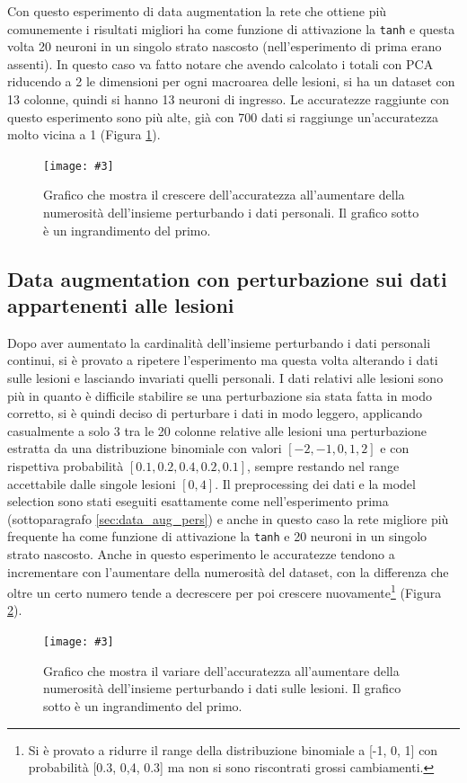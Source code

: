 \documentclass[12pt, twoside, letterpaper]{report}
\newcommand{\img}[4] {
	\begin{figure}
		\centering
		\texttt{[image: \#3]}\\
		\caption{#1}
		\label{fig:#4}
	\end{figure}
}
\begin{document}
			Con questo esperimento di data augmentation la rete che ottiene più comunemente i risultati migliori ha come funzione di attivazione la \texttt{tanh} e questa volta 20 neuroni in un singolo strato nascosto (nell'esperimento di prima erano assenti). In questo caso va fatto notare che avendo calcolato i totali con PCA riducendo a 2 le dimensioni per ogni macroarea delle lesioni, si ha un dataset con 13 colonne, quindi si hanno 13 neuroni di ingresso. Le accuratezze raggiunte con questo esperimento sono più alte, già con 700 dati si raggiunge un'accuratezza molto vicina a 1 (Figura \ref{fig:accuracy_data_aug_pers}).
			
			\img{Grafico che mostra il crescere dell'accuratezza all'aumentare della numerosità dell'insieme perturbando i dati personali. Il grafico sotto è un ingrandimento del primo.}{0.35}{accuracy_data_aug_pers.png}{accuracy_data_aug_pers}
			
		\subsection{Data augmentation con perturbazione sui dati appartenenti alle lesioni} \label{sec:data_aug_les}
			Dopo aver aumentato la cardinalità dell'insieme perturbando i dati personali continui, si è provato a ripetere l'esperimento ma questa volta alterando i dati sulle lesioni e lasciando invariati quelli personali. I dati relativi alle lesioni sono più  in quanto è difficile stabilire se una perturbazione sia stata fatta in modo corretto, si è quindi deciso di perturbare i dati in modo leggero, applicando casualmente a solo 3 tra le 20 colonne relative alle lesioni una perturbazione estratta da una distribuzione binomiale con valori $[-2, -1, 0, 1, 2]$ e con rispettiva probabilità $[0.1, 0.2, 0.4, 0.2, 0.1]$, sempre restando nel range accettabile dalle singole lesioni $[0,4]$. Il preprocessing dei dati e la model selection sono stati eseguiti esattamente come nell'esperimento prima (sottoparagrafo \ref{sec:data_aug_pers}) e anche in questo caso la rete migliore più frequente ha come funzione di attivazione la \texttt{tanh} e 20 neuroni in un singolo strato nascosto. Anche in questo esperimento le accuratezze tendono a incrementare con l'aumentare della numerosità del dataset, con la differenza che oltre un certo numero tende a decrescere per poi crescere nuovamente\footnote{Si è provato a ridurre il range della distribuzione binomiale a [-1, 0, 1] con probabilità [0.3, 0,4, 0.3] ma non si sono riscontrati grossi cambiamenti.} (Figura \ref{fig:accuracy_data_aug_lesioni}). 
			\img{Grafico che mostra il variare dell'accuratezza all'aumentare della numerosità dell'insieme perturbando i dati sulle lesioni. Il grafico sotto è un ingrandimento del primo.}{0.35}{accuracy_data_aug_lesioni.png}{accuracy_data_aug_lesioni}
			
\end{document}
